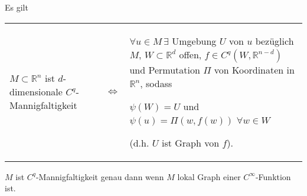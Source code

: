 \begin{proposition}
	Es gilt
	
	\begin{tabularx}{\linewidth}{p{4.5cm}cX}
		$M\subset\mathbb{R}^n$ ist $d$-dimensionale $C^q$-Mannigfaltigkeit & $\Leftrightarrow$ & $\forall u \in M\,\exists$ Umgebung $U$ von $u$ bezüglich $M$, $W\subset \mathbb{R}^d$ offen, $f\in C^q( W, \mathbb{R}^{n-d})$ und Permutation $\Pi$ von Koordinaten in $\mathbb{R}^n$, sodass
		
		$\psi(W) = U$ und $\psi(u) = \Pi(w, f(w))$ $\forall w\in W$
		
		(d.h. $U$ ist Graph von $f$).
	\end{tabularx}

	\begin{underlinedenvironment}[Somit]
		$M$ ist $C^q$-Mannigfaltigkeit genau dann wenn $M$ lokal Graph einer $C^\infty$-Funktion ist.
	\end{underlinedenvironment}
\end{proposition}

